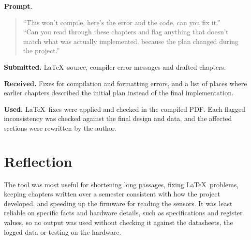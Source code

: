 \textbf{Prompt.}
\begin{quote}\small
``This won't compile, here's the error and the code, can you fix it.''\\[2pt]
``Can you read through these chapters and flag anything that doesn't match what was actually implemented, because the plan changed during the project.''
\end{quote}

\textbf{Submitted.} \LaTeX\ source, compiler error messages and drafted chapters.

\textbf{Received.} Fixes for compilation and formatting errors, and a list of places where earlier chapters described the initial plan instead of the final implementation.

\textbf{Used.} \LaTeX\ fixes were applied and checked in the compiled PDF. Each flagged inconsistency was checked against the final design and data, and the affected sections were rewritten by the author.

\section{Reflection}
\label{app:ai-reflection}

The tool was most useful for shortening long passages, fixing \LaTeX\ problems, keeping chapters written over a semester consistent with how the project developed, and speeding up the firmware for reading the sensors. It was least reliable on specific facts and hardware details, such as specifications and register values, so no output was used without checking it against the datasheets, the logged data or testing on the hardware.